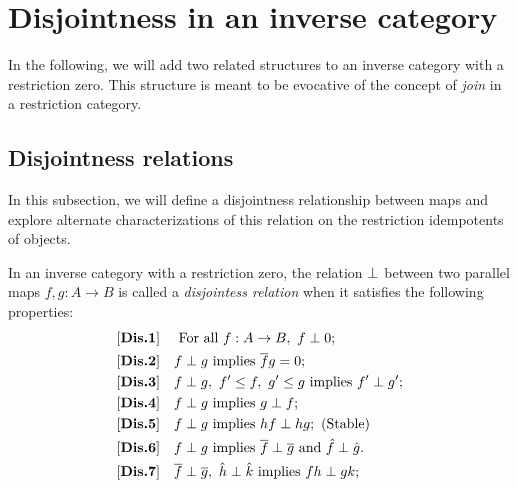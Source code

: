 \section{Disjointness in an inverse category} %
\label{sec:disjointness_in_an_inverse_category}
In the following, we will add two related structures to an inverse category with a
restriction zero. This structure is meant to be evocative of the concept of \emph{join} in a
restriction category.


\subsection{Disjointness relations} %
\label{sub:disjointness_relations}
In this subsection, we will define a disjointness relationship between maps and
explore alternate characterizations of this relation on the restriction idempotents of objects.

\begin{definition}\label{def:disjointness_relation}
  In an inverse category \X with a restriction zero, the relation $\perp$ between two parallel maps
  $f, g:A \to B$ is called a \emph{disjointess relation} when it satisfies the following
  properties:
  \begin{align*}
    \axiom{Dis}{1}\quad &\text{ For all }f:A\to B,\ f\cdperp 0;\\
    \axiom{Dis}{2}\quad &f\cdperp g\text{ implies }\rst{f} g = 0; \\
    \axiom{Dis}{3}\quad &f\cdperp g,\ f' \le f,\ g' \le g\text{ implies }f' \cdperp g';\\
    \axiom{Dis}{4}\quad &f\cdperp g\text{ implies }g \cdperp f;\\
    \axiom{Dis}{5}\quad &f\cdperp g\text{ implies }h f \cdperp h g; \text{ (Stable)}\\
    \axiom{Dis}{6}\quad &f\cdperp g\text{ implies }\rst{f} \cdperp \rst{g}
      \text{ and }\rg{f}\cdperp\rg{g}.\\
    \axiom{Dis}{7}\quad &\rst{f}\cdperp \rst{g},\ \rg{h}\cdperp \rg{k}\text{ implies }f h
      \cdperp g k;
  \end{align*}
\end{definition}

